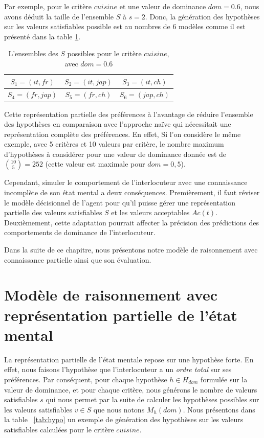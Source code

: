 	Par exemple, pour le critère $cuisine$ et une valeur de dominance $dom =0.6$, nous avons déduit la taille de l'ensemble $S$ à $s=2$. Donc, la génération des hypothèses sur les valeurs satisfiables possible est au nombres de 6 modèles comme il est présenté dans la table \ref{tab:sat_poss}.
	\begin{table}[h]
		\centering
		\caption{L'ensembles des $S$ possibles pour le critère $cuisine$, avec $dom=0.6$}
		\label{tab:sat_poss}
	
		\begin{tabular}{|c|c|c|}%
			\hline
			$S_1=(it,fr)$& $S_2=(it,jap)$ & $S_3=(it,ch)$\\
			\hline
			$S_4=(fr,jap)$ & $S_5=(fr,ch)$ & $S_6=(jap,ch)$ \\
			\hline
		\end{tabular}
	\end{table}
	
	Cette représentation partielle des préférences à l'avantage de réduire l'ensemble des hypothèses en comparaison avec l'approche naïve qui nécessitait une représentation complète des préférences. En effet, Si l'on considère le même exemple, avec 5 critères et 10 valeurs par critère, le nombre maximum d'hypothèses à considérer pour une valeur de dominance donnée est de $ \binom {10} {5} = 252 $ (cette valeur est maximale pour $ dom = 0,5 $).
	
	Cependant, simuler le comportement de l'interlocuteur avec une connaissance incomplète de son état mental a deux conséquences.
	Premièrement, il faut réviser  le modèle décisionnel de l'agent pour qu'il puisse gérer une représentation partielle des valeurs satisfiables $S$ et les valeurs acceptables $Ac(t)$. Deuxièmement, cette adaptation pourrait affecter la précision des prédictions des comportements de dominance de l'interlocuteur.
	
	Dans la suite de ce chapitre, nous présentons notre modèle de raisonnement avec connaissance partielle ainsi que son évaluation. 
	
	

\section{Modèle de raisonnement avec représentation partielle de l'état mental}
La représentation partielle de l'état mentale repose sur une hypothèse forte. En effet, nous faisons l'hypothèse que l'interlocuteur a un \textit{ordre total} sur ses préférences. Par conséquent, pour chaque hypothèse $h\in H_{dom} $ formulée sur la valeur de dominance, et pour chaque critère, nous générons le nombre de valeurs satisfiables $s$ qui nous permet par la suite de calculer les hypothèses possibles sur les valeurs satisfiables $v\in S$ que nous notons $M_h(dom)$. Nous présentons dans la table ~\ref{tab:hypo} un exemple de génération des hypothèses sur les valeurs satisfiables calculées pour le critère $cuisine$. 

